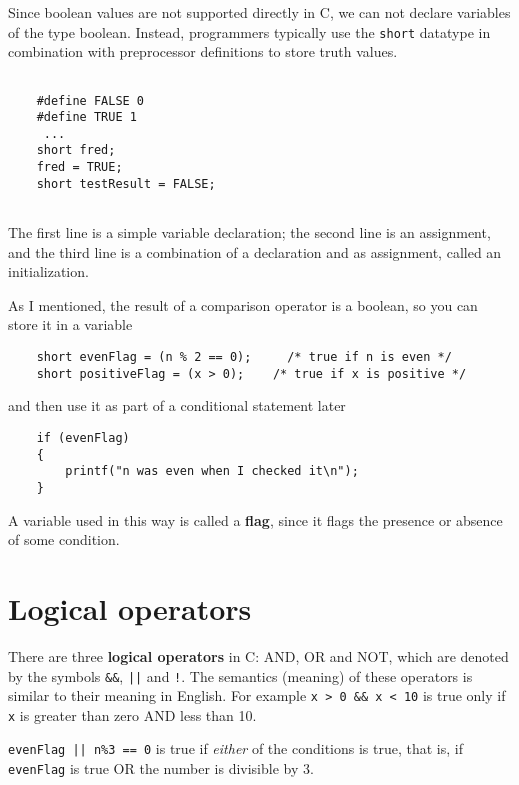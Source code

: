 Since boolean values are not supported directly in C, we can not declare
variables of the type boolean. 
Instead, programmers typically use the {\tt short} datatype in combination with 
preprocessor definitions to store truth values.

\begin{verbatim}

    #define FALSE 0
    #define TRUE 1
     ...
    short fred;
    fred = TRUE;
    short testResult = FALSE;
    
\end{verbatim}
%
The first line is a simple variable declaration;
the second line is an assignment, and the third line is a
combination of a declaration and as assignment, 
called an initialization.


As I mentioned, the result of a comparison operator is a boolean,
so you can store it in a variable

\begin{verbatim}
    short evenFlag = (n % 2 == 0);     /* true if n is even */
    short positiveFlag = (x > 0);    /* true if x is positive */
\end{verbatim}
%
and then use it as part of a conditional statement later

\begin{verbatim}
    if (evenFlag) 
    {
        printf("n was even when I checked it\n");
    }
\end{verbatim}
%
A variable used in this way is called a {\bf flag},
since it flags the presence or absence of some condition.


\section{Logical operators}

There are three {\bf logical operators} in C: AND, OR and NOT,
which are denoted by the symbols {\tt \&\&}, {\tt ||} and
{\tt !}.  The semantics (meaning) of these operators is similar
to their meaning in English.  For example {\tt x > 0 \&\& x < 10}
is true only if {\tt x} is greater than zero AND less than 10.


{\tt evenFlag || n\%3 == 0} is true if {\em either} of
the conditions is true, that is, if {\tt evenFlag} is true OR the
number is divisible by 3.


